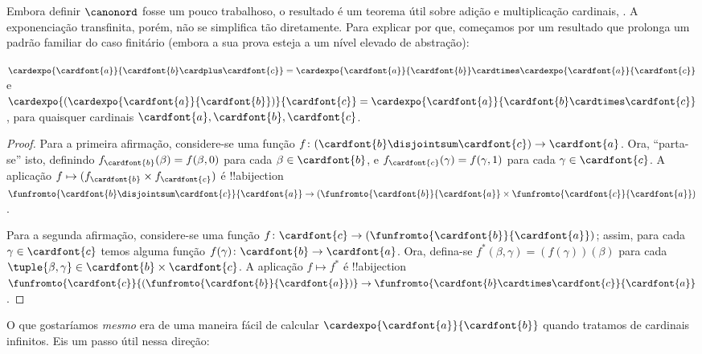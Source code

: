 \documentclass[../../../include/open-logic-section]{subfiles}
\begin{document}


Embora definir $\canonord$ fosse um pouco trabalhoso, o resultado é um
teorema útil sobre adição e multiplicação cardinais,
. A exponenciação transfinita, porém,
não se simplifica tão diretamente. Para explicar por que, começamos
por um resultado que prolonga um padrão familiar do caso finitário
(embora a sua prova esteja a um nível elevado de abstração):

\begin{prop}
$\cardexpo{\cardfont{a}}{\cardfont{b} \cardplus \cardfont{c}} =
\cardexpo{\cardfont{a}}{\cardfont{b}} \cardtimes
\cardexpo{\cardfont{a}}{\cardfont{c}}$ e
$\cardexpo{(\cardexpo{\cardfont{a}}{\cardfont{b}})}{\cardfont{c}} =
\cardexpo{\cardfont{a}}{\cardfont{b} \cardtimes \cardfont{c}}$, para
quaisquer cardinais $\cardfont{a}, \cardfont{b}, \cardfont{c}$.
\end{prop}

\begin{proof}
Para a primeira afirmação, considere-se uma função $f \colon
(\cardfont{b}\disjointsum\cardfont{c}) \to \cardfont{a}$. Ora, ``parta-se'' isto, definindo $f_\cardfont{b}(\beta) = f(\beta, 0)$ para cada
$\beta \in \cardfont{b}$, e $f_\cardfont{c}(\gamma) = f(\gamma, 1)$
para cada $\gamma \in \cardfont{c}$. A aplicação $f \mapsto
(f_{\cardfont{b}} \times f_\cardfont{c})$ é !!a{bijection}
$\funfromto{\cardfont{b} \disjointsum \cardfont{c}}{\cardfont{a}} \to
(\funfromto{\cardfont{b}}{\cardfont{a}} \times
\funfromto{\cardfont{c}}{\cardfont{a}})$. 

Para a segunda afirmação, considere-se uma função $f \colon \cardfont{c} \to
(\funfromto{\cardfont{b}}{\cardfont{a}})$; assim, para cada $\gamma \in
\cardfont{c}$ temos alguma função $f(\gamma) \colon \cardfont{b} \to
\cardfont{a}$. Ora, defina-se $f^*(\beta, \gamma) = (f(\gamma))(\beta)$
para cada $\tuple{\beta, \gamma} \in \cardfont{b} \times \cardfont{c}$.
A aplicação $f \mapsto f^*$ é !!a{bijection}
$\funfromto{\cardfont{c}}{(\funfromto{\cardfont{b}}{\cardfont{a}})}
\to \funfromto{\cardfont{b} \cardtimes \cardfont{c}}{\cardfont{a}}$. 
\end{proof}

O que gostaríamos \emph{mesmo} era de uma maneira fácil de calcular
$\cardexpo{\cardfont{a}}{\cardfont{b}}$ quando tratamos de
cardinais infinitos. Eis um passo útil nessa direção:
\end{document}
